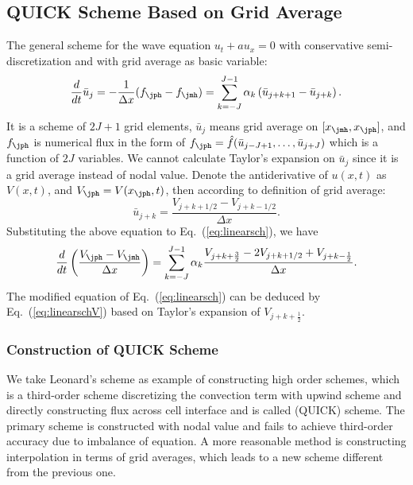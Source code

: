 \documentclass[]{article}
\begin{document}
\subsection{QUICK Scheme Based on Grid Average} \label{sec:quick-scheme-based}

The general scheme for the wave equation $u_t+a u_x=0$ with
conservative semi-discretization and with grid average as basic variable:
\begin{equation}
    \frac{d}{dt}\bar u_j = -\frac{1}{\Delta x}(f_{\jph}-f_{\jmh})=\sum_{k=-J}^{J-1}\alpha_k\left(\bar u_{j+k+1}-\bar u_{j+k}\right).
    \label{eq:linearsch}
\end{equation}
It is a scheme of $2J+1$ grid elements, $\bar u_j$ means grid
average on $[x_{\jmh}, x_\jph]$, and $f_\jph$ is numerical flux in the
form of $f_{\jph} = \hat f(\bar u_{j-J+1},\ldots,\bar u_{j+J})$ which
is a function of $2J$ variables.
We cannot calculate Taylor's expansion on $\bar u_j$ since it is a
grid average instead of nodal value. Denote the antiderivative of
$u(x,t)$ as $V(x,t)$, and $V_\jph = V(x_\jph,t)$, then according to
definition of grid average:
\begin{equation}
    \bar u_{j+k}=\frac{V_{j+k+1/2}-V_{j+k-1/2}}{\Delta x}.
    \label{eq:ujkV}
\end{equation}
Substituting the above equation to Eq.~(\ref{eq:linearsch}), we have 
\begin{equation}
    \frac{d}{dt}\left(\frac{V_{\jph}-V_{\jmh}}{\Delta x}\right)=\sum_{k=-J}^{J-1}\alpha_k\frac{V_{j+k+\frac{3}{2}}-2V_{j+k+1/2}+V_{j+k-\frac{1}{2}}}{\Delta x}.
    \label{eq:linearschV}
\end{equation}
The modified equation of Eq.~(\ref{eq:linearsch}) can be deduced by
Eq.~(\ref{eq:linearschV}) based on Taylor's expansion of $V_{j+k+\frac 12}$.

\subsubsection{Construction of QUICK Scheme} \label{sec:construct-quick}

We take Leonard's scheme \cite{leonard1979stable}
as example of constructing high order schemes, which is a third-order scheme
discretizing the convection term with upwind scheme and directly constructing
flux across cell interface and is called (QUICK) scheme.
The primary scheme is constructed with nodal value
and fails to achieve third-order accuracy due to imbalance of equation.
A more reasonable method is constructing interpolation in terms of grid 
averages,
which leads to a new scheme different from the previous one.
\end{document}
